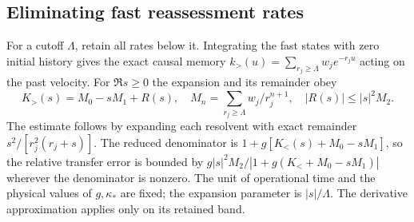 \documentclass[11pt]{article}
\begin{document}
\subsection{Eliminating fast reassessment rates}
For a cutoff \(\Lambda\), retain all rates below it. Integrating the fast
states with zero initial history gives the exact causal memory
\(k_>(u)=\sum_{r_j\ge\Lambda} w_j e^{-r_ju}\) acting on the past velocity.
For \(\Re s\ge0\) the expansion and its remainder obey
\[
 K_>(s)=M_0-sM_1+R(s),\quad
 M_n=\sum_{r_j\ge\Lambda}w_j/r_j^{n+1},\quad |R(s)|\le |s|^2 M_2 .
\]
The estimate follows by expanding each resolvent with exact remainder
\(s^2/[r_j^2(r_j+s)]\). The reduced denominator is
\(1+g[K_<(s)+M_0-sM_1]\), so the relative transfer error is bounded by
\(g|s|^2 M_2/|1+g(K_<+M_0-sM_1)|\) wherever the denominator is nonzero.
The unit of operational time and the physical values of \(g,\kappa_*\)
are fixed; the expansion parameter is \(|s|/\Lambda\).
The derivative approximation applies only on its retained band.
\end{document}

